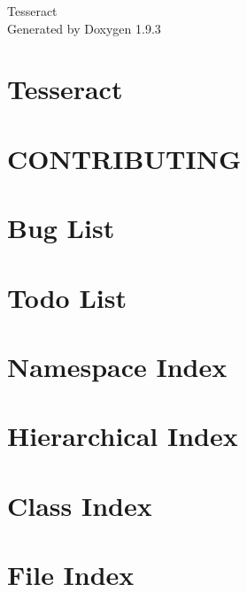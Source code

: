 \documentclass[twoside]{book}
\newcommand{\+}{\discretionary{\mbox{\scriptsize$\hookleftarrow$}}{}{}}
\newcommand{\clearemptydoublepage}{%
    \newpage{\pagestyle{empty}\cleardoublepage}%
  }
\begin{document}
  \raggedbottom
    \hypersetup{pageanchor=false,
                bookmarksnumbered=true,
                pdfencoding=unicode
               }
  \begin{titlepage}
  \vspace*{7cm}
  \begin{center}%
  {\Large Tesseract}\\
  \vspace*{1cm}
  {\large Generated by Doxygen 1.9.3}\\
  \end{center}
  \end{titlepage}
  \clearemptydoublepage
  \tableofcontents
  \clearemptydoublepage
  \hypersetup{pageanchor=true}
\chapter{Tesseract}
\label{index}\hypertarget{index}{}
\chapter{CONTRIBUTING}
\label{md_CONTRIBUTING}

\chapter{Bug List}
\label{bug}

\chapter{Todo List}
\label{todo}

\chapter{Namespace Index}

\chapter{Hierarchical Index}

\chapter{Class Index}

\chapter{File Index}

\end{document}

